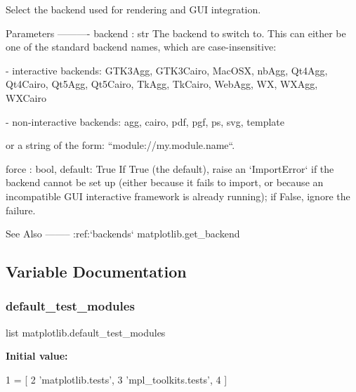 \begin{DoxyVerb}Select the backend used for rendering and GUI integration.

Parameters
----------
backend : str
    The backend to switch to.  This can either be one of the standard
    backend names, which are case-insensitive:

    - interactive backends:
      GTK3Agg, GTK3Cairo, MacOSX, nbAgg,
      Qt4Agg, Qt4Cairo, Qt5Agg, Qt5Cairo,
      TkAgg, TkCairo, WebAgg, WX, WXAgg, WXCairo

    - non-interactive backends:
      agg, cairo, pdf, pgf, ps, svg, template

    or a string of the form: ``module://my.module.name``.

force : bool, default: True
    If True (the default), raise an `ImportError` if the backend cannot be
    set up (either because it fails to import, or because an incompatible
    GUI interactive framework is already running); if False, ignore the
    failure.

See Also
--------
:ref:`backends`
matplotlib.get_backend
\end{DoxyVerb}
 

\subsection{Variable Documentation}
\mbox{\label{namespacematplotlib_a86a0208b6f53ed86ebee511aa69d45bb}} 
\subsubsection{\texorpdfstring{default\+\_\+test\+\_\+modules}{default\_test\_modules}}
{\footnotesize\ttfamily list matplotlib.\+default\+\_\+test\+\_\+modules}

{\bfseries Initial value\+:}
\begin{DoxyCode}
1 =  [
2     \textcolor{stringliteral}{'matplotlib.tests'},
3     \textcolor{stringliteral}{'mpl\_toolkits.tests'},
4 ]
\end{DoxyCode}
\mbox{\label{namespacematplotlib_ae61a514c4b7b0c30f9d36eea8cece8a6}} 
